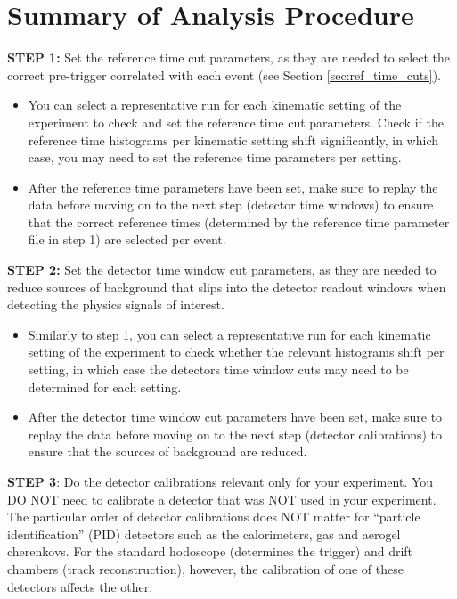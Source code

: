 \documentclass[14pt]{article}
\begin{document}
\section{Summary of Analysis Procedure}
\textbf{STEP 1:} Set the reference time cut parameters, as they are needed to select the correct pre-trigger correlated with each event (see Section \ref{sec:ref_time_cuts}).
\begin{itemize}
\item You can select a representative run for each kinematic setting of the experiment to check and set the reference time cut parameters. Check if the reference time histograms per
  kinematic setting shift significantly, in which case, you may need to set the reference time parameters per setting.  
\item After the reference time parameters have been set, make sure to replay the data before moving on to the next step (detector time windows) to ensure
  that the correct reference times (determined by the reference time parameter file in step 1) are selected per event. 
\end{itemize}
\textbf{STEP 2:} Set the detector time window cut parameters, as they are needed to reduce sources of background that slips into the detector readout windows when detecting the physics signals of interest.
\begin{itemize}
  \item Similarly to step 1, you can select a representative run for each kinematic setting of the experiment to check whether the relevant histograms shift per setting, in which case the detectors time window cuts
    may need to be determined for each setting.
  \item After the detector time window cut parameters have been set, make sure to replay the data before moving on to the next step (detector calibrations) to ensure that the sources of background are reduced.
\end{itemize}
\textbf{STEP 3}: Do the detector calibrations relevant only for your experiment. You DO NOT need to calibrate a detector that was NOT used in your experiment. The particular order of detector calibrations does
NOT matter for ``particle identification'' (PID) detectors such as the calorimeters, gas and aerogel cherenkovs. For the standard hodoscope (determines the trigger) and drift chambers (track reconstruction),
however, the calibration of one of these detectors affects the other.
\end{document}
